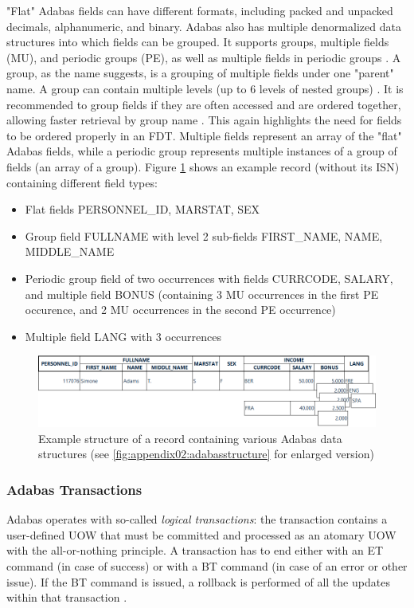 "Flat" Adabas fields can have different formats, including packed and unpacked decimals, alphanumeric, and binary. Adabas also has multiple denormalized data structures into which fields can be grouped. It supports groups, multiple fields (MU), and periodic groups (PE), as well as multiple fields in periodic groups \cite{aebi1996reengineering}. A group, as the name suggests, is a grouping of multiple fields under one "parent" name. A group can contain multiple levels (up to 6 levels of nested groups) \cite{storr1994effizienter}. It is recommended to group fields if they are often accessed and are ordered together, allowing faster retrieval by group name \cite{adabasconcepts}. This again highlights the need for fields to be ordered properly in an \ac{FDT}. Multiple fields represent an array of the "flat" Adabas fields, while a periodic group represents multiple instances of a group of fields (an array of a group). Figure \ref{fig:fundamentals:datastructure} shows an example record (without its \ac{ISN}) containing different field types:
\begin{itemize}
    \item Flat fields PERSONNEL\_ID, MARSTAT, SEX
    \item Group field FULLNAME with level 2 sub-fields FIRST\_NAME, NAME, MIDDLE\_NAME
    \item Periodic group field of two occurrences with fields CURRCODE, SALARY, and multiple field BONUS (containing 3 MU occurrences in the first PE occurence, and 2 MU occurrences in the second PE occurrence)
    \item Multiple field LANG with 3 occurrences
\end{itemize}

\begin{figure}[htbp]
 \centering
 \includegraphics[width=1\textwidth]{chapters/images/datastructures.png}
 \caption[Example structure of a record containing various Adabas data structures]{Example structure of a record containing various Adabas data structures (see \ref{fig:appendix02:adabasstructure} for enlarged version)}
 \label{fig:fundamentals:datastructure}
\end{figure}

\subsubsection{Adabas Transactions}
\label{ch02:fundamentals:adabas:forzos:transactions}
Adabas operates with so-called \textit{logical transactions}: the transaction contains a user-defined \ac{UOW} that must be committed and processed as an atomary \ac{UOW} with the all-or-nothing principle. A transaction has to end either with an \ac{ET} command (in case of success) or with a \ac{BT} command (in case of an error or other issue). If the \ac{BT} command is issued, a rollback is performed of all the updates within that transaction \cite{adabasconcepts}.


